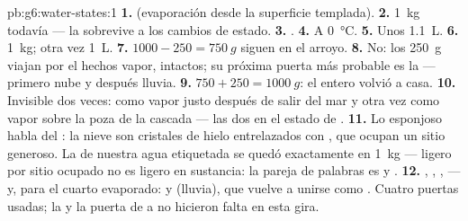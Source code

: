 \begin{solution}{pb:g6:water-states:1}
\textbf{1.}  (evaporación desde la superficie
templada).
\textbf{2.} \qty{1}{kg} todavía --- la  sobrevive a los cambios
de estado.
\textbf{3.} .
\textbf{4.} A \qty{0}{\celsius}.
\textbf{5.} Unos \qty{1.1}{L}.
\textbf{6.}  \qty{1}{kg};  otra vez \qty{1}{L}.
\textbf{7.} $1000 - 250 = \qty{750}{g}$ siguen en el arroyo.
\textbf{8.} No: los \qty{250}{g} viajan por el  hechos vapor,
intactos; su próxima puerta más probable es la  ---
primero nube y después lluvia.
\textbf{9.} $750 + 250 = \qty{1000}{g}$: el  entero volvió a
casa.
\textbf{10.} Invisible dos veces: como vapor justo después de salir
del mar y otra vez como vapor sobre la poza de la cascada --- las dos
en el estado de .
\textbf{11.} Lo esponjoso habla del \emph{}: la nieve son
cristales de hielo entrelazados con , que ocupan un sitio
generoso. La \emph{} de nuestra agua etiquetada se quedó
exactamente en \qty{1}{kg} --- ligero por sitio ocupado no es ligero
en sustancia: la pareja de palabras es  y .
\textbf{12.} , ,
,  --- y, para el cuarto evaporado:
 y  (lluvia), que vuelve a unirse como
. Cuatro puertas usadas; la  y la puerta de
 a  no hicieron falta en esta gira.
\end{solution}
